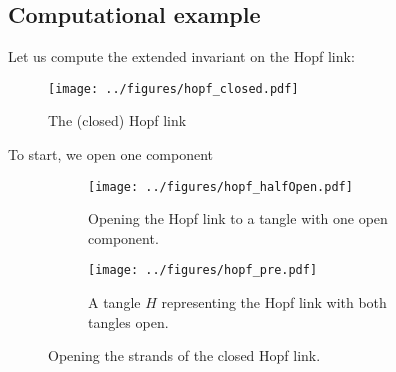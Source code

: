 \documentclass{beamer}
\theoremstyle{theorem}
\begin{document}
\subsection{Computational example}

\begin{frame}
        Let us compute the extended invariant on the Hopf link:
        \begin{figure}
                \centering
                \texttt{[image: ../figures/hopf\_closed.pdf]}
                \caption{The (closed) Hopf link}
                \label{fig:hopf_closed}
        \end{figure}
\end{frame}

\begin{frame}
        To start, we open one component
        \begin{figure}[ht]
                \begin{subfigure}[b]{0.4\textwidth}
                        \centering
                        \texttt{[image: ../figures/hopf\_halfOpen.pdf]}
                        \caption{Opening the Hopf link to a tangle with one open
                        component.}
                        \label{fig:hopf_halfOpen}
                \end{subfigure}
                \begin{subfigure}[b]{0.4\textwidth}
                        \centering
                        \texttt{[image: ../figures/hopf\_pre.pdf]}
                        \caption{A tangle $H$ representing the Hopf link with both
                        tangles open.}
                        \label{fig:hopf_pre}
                \end{subfigure}
                \label{fig:hopf_decompose}
                \caption{Opening the strands of the closed Hopf link.}
        \end{figure}
\end{frame}
\end{document}

